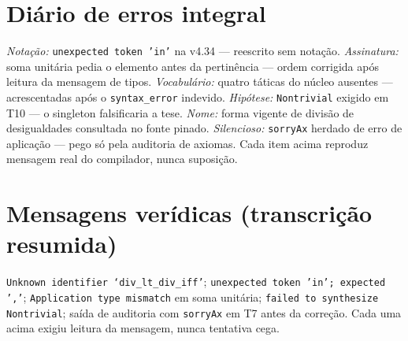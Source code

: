 \section{Diário de erros integral}
\textit{Notação:} \texttt{unexpected token 'in'} na v4.34 --- reescrito sem notação. \textit{Assinatura:} soma unitária pedia o elemento antes da pertinência --- ordem corrigida após leitura da mensagem de tipos. \textit{Vocabulário:} quatro táticas do núcleo ausentes --- acrescentadas após o \texttt{syntax\_error} indevido. \textit{Hipótese:} \texttt{Nontrivial} exigido em T10 --- o singleton falsificaria a tese. \textit{Nome:} forma vigente de divisão de desigualdades consultada no fonte pinado. \textit{Silencioso:} \texttt{sorryAx} herdado de erro de aplicação --- pego só pela auditoria de axiomas. Cada item acima reproduz mensagem real do compilador, nunca suposição.
\section{Mensagens verídicas (transcrição resumida)}
\texttt{Unknown identifier `div\_lt\_div\_iff'}; \texttt{unexpected token 'in'; expected ','}; \texttt{Application type mismatch} em soma unitária; \texttt{failed to synthesize Nontrivial}; saída de auditoria com \texttt{sorryAx} em T7 antes da correção. Cada uma acima exigiu leitura da mensagem, nunca tentativa cega.
